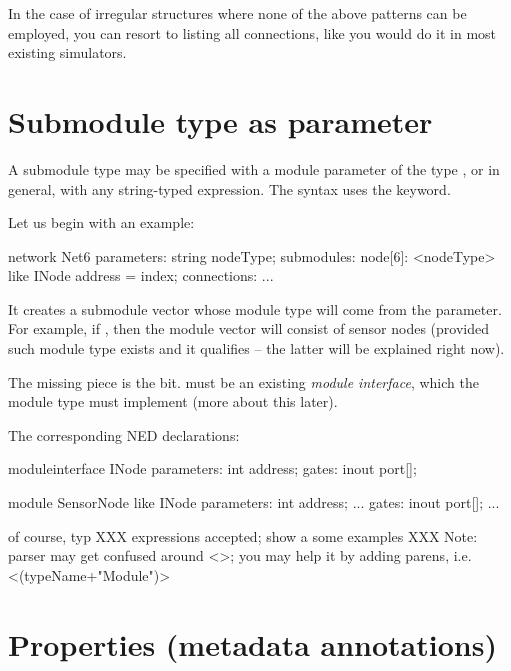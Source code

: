In the case of irregular structures where none of the above patterns
can be employed, you can resort to listing all connections, like you
would do it in most existing simulators.



\section{Submodule type as parameter}
\label{sec:ch-ned-lang:submodule-like}

A submodule type may be specified with a module parameter of the type
, or in general, with any string-typed expression.
The syntax uses the  keyword.

Let us begin with an example:

\begin{ned}
network Net6
{
    parameters:
        string nodeType;
    submodules:
        node[6]: <nodeType> like INode {
            address = index;
        }
    connections:
        ...
}
\end{ned}

It creates a submodule vector whose module type will come from the
 parameter. For example, if ,
then the module vector will consist of sensor nodes (provided such module
type exists and it qualifies -- the latter will be explained right now).

The missing piece is the  bit.  must be
an existing \textit{module interface}, which the 
module type must implement (more about this later).

The corresponding NED declarations:

\begin{ned}
moduleinterface INode
{
    parameters:
        int address;
    gates:
        inout port[];
}
\end{ned}

\begin{ned}
module SensorNode like INode
{
    parameters:
        int address;
        ...
    gates:
        inout port[];
        ...
}
\end{ned}

of course, typ
XXX expressions accepted; show a some examples
XXX Note: parser may get confused around <>; you may help it by adding parens, i.e. <(typeName+"Module")>


\section{Properties (metadata annotations)}
\label{sec:ch-ned-lang:properties}

